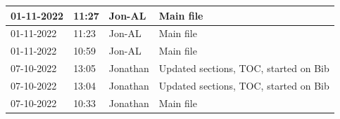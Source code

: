 \documentclass[11pt]{article}
\begin{document}
\begin{center}
\begin{longtable}{|p{2cm}|l|p{2cm}|p{10.5cm}|}
            01-11-2022                                 & 11:27                              & Jon-AL                                  & Main file                                                                                                                                                                                                                                                                                                    \\ \hline
            01-11-2022                                 & 11:23                              & Jon-AL                                  & Main file                                                                                                                                                                                                                                                                                                    \\ \hline
            01-11-2022                                 & 10:59                              & Jon-AL                                  & Main file                                                                                                                                                                                                                                                                                                    \\ \hline
            07-10-2022                                 & 13:05                              & Jonathan                                & Updated sections, TOC, started on Bib                                                                                                                                                                                                                                                                        \\ \hline
            07-10-2022                                 & 13:04                              & Jonathan                                & Updated sections, TOC, started on Bib                                                                                                                                                                                                                                                                        \\ \hline
            07-10-2022                                 & 10:33                              & Jonathan                                & Main file                                                                                                                                                                                                                                                                                                    \\ \hline

\end{longtable}
\end{center}
\end{document}
